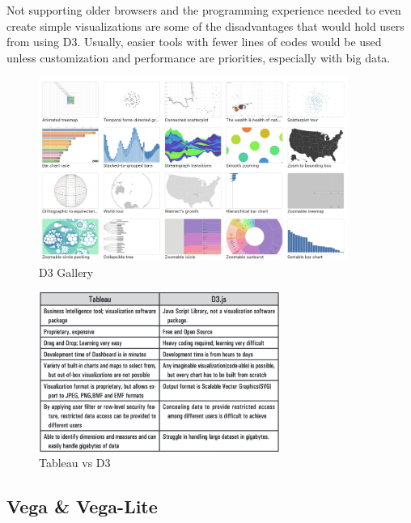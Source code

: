 Not supporting older browsers and the programming experience needed to even create simple visualizations are some of the disadvantages that would hold users from using D3. Usually, easier tools with fewer lines of codes would be used unless customization and performance are priorities, especially with big data. 

\begin{figure}[H]
\centering
\captionsetup{justification=centering}
\includegraphics[width=0.9\textwidth]{Report-latex/tex_files/pics/d3.png}
\caption{D3 Gallery \cite{d3g}}
\label{fig:d3}
\end{figure}


\begin{figure}[H]
\centering
\captionsetup{justification=centering}
\includegraphics[width=0.7\textwidth]{Report-latex/tex_files/pics/tVd3.png}
\caption{Tableau vs D3 \cite{nair2016interactive}}
\label{fig:tableauvsd3}
\end{figure}

\subsection{Vega \& Vega-Lite}

